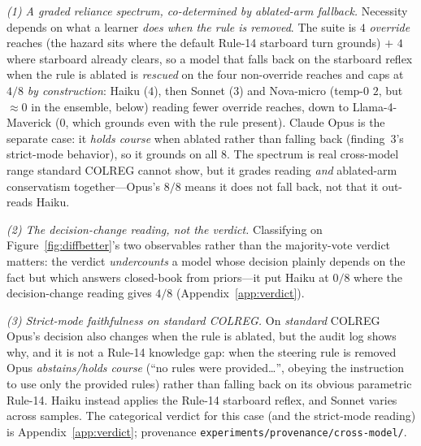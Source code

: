 \documentclass{article}
\begin{document}
\emph{(1) A graded reliance spectrum, co-determined by ablated-arm fallback.} Necessity depends on what a
learner \emph{does when the rule is removed}. The suite is $4$ \emph{override} reaches (the hazard sits
where the default Rule-14 starboard turn grounds) $+$ $4$ where starboard already clears, so a model that
falls back on the starboard reflex when the rule is ablated is \emph{rescued} on the four non-override
reaches and caps at $4/8$ \emph{by construction}: Haiku ($4$), then Sonnet ($3$) and Nova-micro (temp-$0$
$2$, but $\approx\!0$ in the ensemble, below) reading fewer override reaches, down to Llama-4-Maverick
($0$, which grounds even with the rule present). Claude Opus is the separate case: it \emph{holds course}
when ablated rather than falling back (finding~3's strict-mode behavior), so it grounds on all $8$. The
spectrum is real cross-model range standard COLREG cannot show, but it grades reading \emph{and}
ablated-arm conservatism together---Opus's $8/8$ means it does not fall back, not that it out-reads Haiku.

\emph{(2) The decision-change reading, not the verdict.} Classifying on Figure~\ref{fig:diffbetter}'s two
observables rather than the majority-vote verdict matters: the verdict \emph{undercounts} a model whose
decision plainly depends on the fact but which answers closed-book from priors---it put Haiku at $0/8$ where
the decision-change reading gives $4/8$ (Appendix~\ref{app:verdict}).

\emph{(3) Strict-mode faithfulness on standard COLREG.} On \emph{standard} COLREG Opus's decision also
changes when the rule is ablated, but the audit log shows why, and it is not a Rule-14 knowledge gap: when
the steering rule is removed Opus \emph{abstains/holds course} (``no rules were provided\ldots'', obeying the
instruction to use only the provided rules) rather than falling back on its obvious parametric Rule-14. Haiku
instead applies the Rule-14 starboard reflex, and Sonnet varies across samples. The categorical verdict for
this case (and the strict-mode reading) is Appendix~\ref{app:verdict}; provenance
\texttt{experiments/provenance/cross-model/}.
\end{document}
